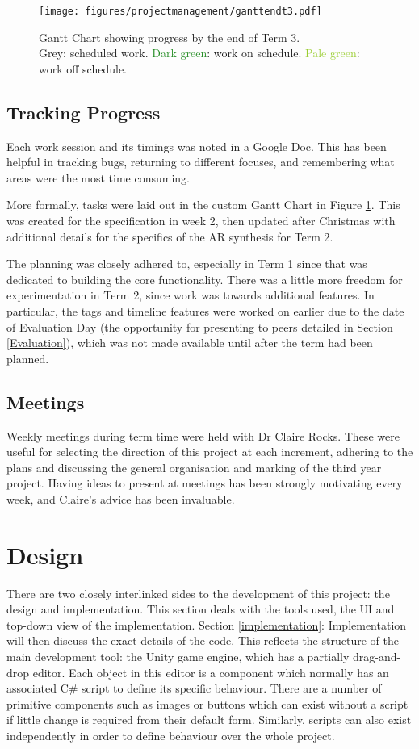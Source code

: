 \documentclass[12pt, a4paper]{article}
\newcommand{\light}[1]{\textcolor{mygrey}{#1}}
\begin{document}
\newpage

\begin{figure}[H]
    \texttt{[image: figures/projectmanagement/ganttendt3.pdf]}
        \caption{Gantt Chart showing progress by the end of Term 3. \\ \light{Grey}: scheduled work. \textcolor{ForestGreen}{Dark green}: work on schedule. \textcolor{YellowGreen}{Pale green}: work off schedule.}
        \label{fig:gantt}
\end{figure}

\subsection{Tracking Progress}
Each work session and its timings was noted in a Google Doc. This has been helpful in tracking bugs, returning to different focuses, and remembering what areas were the most time consuming.

More formally, tasks were laid out in the custom Gantt Chart in Figure \ref{fig:gantt}. This was created for the specification in week 2, then updated after Christmas with additional details for the specifics of the AR synthesis for Term 2. 

The planning was closely adhered to, especially in Term 1 since that was dedicated to building the core functionality. There was a little more freedom for experimentation in Term 2, since work was towards additional features. In particular, the tags and timeline features were worked on earlier due to the date of Evaluation Day (the opportunity for presenting to peers detailed in Section \ref{Evaluation}), which was not made available until after the term had been planned.

\subsection{Meetings}
Weekly meetings during term time were held with Dr Claire Rocks. These were useful for selecting the direction of this project at each increment, adhering to the plans and discussing the general organisation and marking of the third year project. Having ideas to present at meetings has been strongly motivating every week, and Claire's advice has been invaluable.

\newpage
\section{Design}
There are two closely interlinked sides to the development of this project: the design and implementation. This section deals with the tools used, the UI and top-down view of the implementation. Section \ref{implementation}: Implementation will then discuss the exact details of the code. This reflects the structure of the main development tool: the Unity game engine, which has a partially drag-and-drop editor. Each object in this editor is a component which normally has an associated C\# script to define its specific behaviour. There are a number of primitive components such as images or buttons which can exist without a script if little change is required from their default form. Similarly, scripts can also exist independently in order to define behaviour over the whole project.
\end{document}
